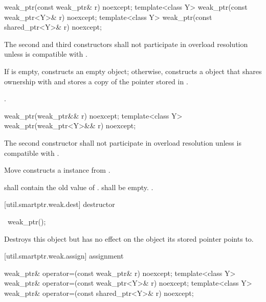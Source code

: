 %
\begin{itemdecl}
weak_ptr(const weak_ptr& r) noexcept;
template<class Y> weak_ptr(const weak_ptr<Y>& r) noexcept;
template<class Y> weak_ptr(const shared_ptr<Y>& r) noexcept;
\end{itemdecl}

\begin{itemdescr}
\pnum\remarks The second and third constructors shall not participate in
overload resolution unless  is compatible with .

\pnum\effects  If  is empty, constructs
an empty  object; otherwise, constructs
a  object that shares ownership
with  and stores a copy of the pointer stored in .

\pnum\postconditions  {}.
\end{itemdescr}

%
\begin{itemdecl}
weak_ptr(weak_ptr&& r) noexcept;
template<class Y> weak_ptr(weak_ptr<Y>&& r) noexcept;
\end{itemdecl}

\begin{itemdescr}
\pnum\remarks The second constructor shall not participate in overload resolution unless
 is compatible with .

\pnum\effects Move constructs a  instance from .

\pnum\postconditions {} shall contain the old value of .
 shall be empty. .
\end{itemdescr}

[util.smartptr.weak.dest]{ destructor}

%
\begin{itemdecl}
~weak_ptr();
\end{itemdecl}

\begin{itemdescr}
\pnum\effects  Destroys this  object but has no
effect on the object its stored pointer points to.
\end{itemdescr}

[util.smartptr.weak.assign]{ assignment}

%
\begin{itemdecl}
weak_ptr& operator=(const weak_ptr& r) noexcept;
template<class Y> weak_ptr& operator=(const weak_ptr<Y>& r) noexcept;
template<class Y> weak_ptr& operator=(const shared_ptr<Y>& r) noexcept;
\end{itemdecl}

